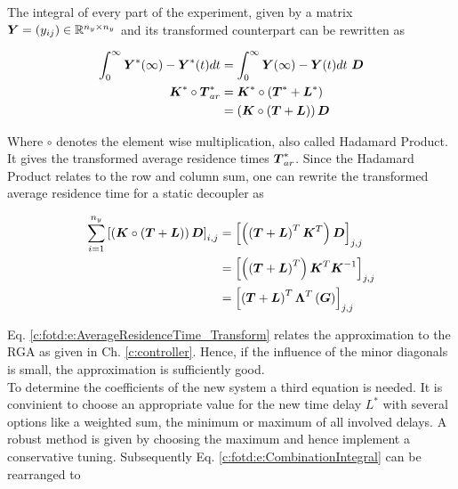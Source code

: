 The integral of every part of the experiment, given by a matrix $\mbox{\boldmath$Y$} = (y_{ij}) \in \mathbb{R}^{n_y \times n_y}$ and its transformed counterpart can be rewritten as

\begin{align}
\begin{split}
\int_0^\infty \mbox{\boldmath$Y$}^*(\infty) - \mbox{\boldmath$Y$}^*(t) dt &= \int_0^\infty \mbox{\boldmath$Y$}(\infty) - \mbox{\boldmath$Y$}(t) dt ~\mbox{\boldmath$D$} \\
\mbox{\boldmath$K$}^* \circ \mbox{\boldmath$T$}_{ar}^{*} &= \mbox{\boldmath$K$}^* \circ \left( \mbox{\boldmath$T$}^* + \mbox{\boldmath$L$}^* \right) \\
&= \left(\mbox{\boldmath$K$} \circ \left( \mbox{\boldmath$T$} + \mbox{\boldmath$L$} \right) \right) \mbox{\boldmath$D$}\\
\end{split}
\label{c:fotd:e:CombinationIntegral}
\end{align}

Where $\circ$ denotes the element wise multiplication, also called Hadamard Product. It gives the transformed average residence times $\mbox{\boldmath$T$}_{ar}^*$. Since the Hadamard Product relates to the row and column sum, one can rewrite the transformed average residence time for a static decoupler as

\begin{align}
\begin{split}
\sum_{i = 1}^{n_y} \left[ \left(\mbox{\boldmath$K$} \circ \left( \mbox{\boldmath$T$} + \mbox{\boldmath$L$} \right) \right) \mbox{\boldmath$D$} \right]_{i,j} &= \left[\left(\left( \mbox{\boldmath$T$} + \mbox{\boldmath$L$} \right)^T \mbox{\boldmath$K$}^T \right) \mbox{\boldmath$D$} \right]_{j,j}\\
&= \left[\left(\left( \mbox{\boldmath$T$} + \mbox{\boldmath$L$} \right)^T \right) \mbox{\boldmath$K$}^T  \mbox{\boldmath$K$}^{-1} \right]_{j,j}\\
&= \left[\left( \mbox{\boldmath$T$} + \mbox{\boldmath$L$} \right)^T \mbox{\boldmath$\Lambda$}^T\left( \mbox{\boldmath$G$} \right) \right]_{j,j} 
\end{split}
\label{c:fotd:e:AverageResidenceTime_Transform}
\end{align}
 
Eq. \ref{c:fotd:e:AverageResidenceTime_Transform} relates the approximation to the RGA as given in Ch. \ref{c:controller}. Hence, if the influence of the minor diagonals is small, the approximation is sufficiently good.\\

To determine the coefficients of the new system a third equation is needed. It is convinient to choose an appropriate value for the new time delay $L^*$ with several options like a weighted sum, the minimum or maximum of all involved delays. A robust method is given by choosing the maximum and hence implement a conservative tuning. Subsequently Eq. \ref{c:fotd:e:CombinationIntegral} can be rearranged to

